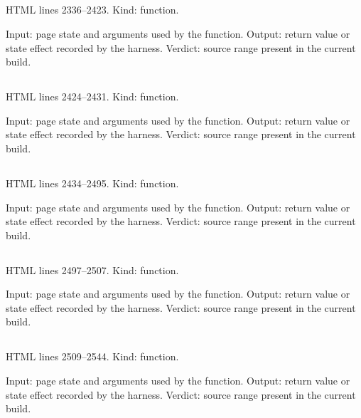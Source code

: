 \subsection*{\texttt{}}
\label{vf_60_decodeAcq}
HTML lines 2336--2423. Kind: function.

Input: page state and arguments used by the function.
Output: return value or state effect recorded by the harness.
Verdict: source range present in the current build.

\subsection*{\texttt{}}
\label{vf_61_acquisitionStats}
HTML lines 2424--2431. Kind: function.

Input: page state and arguments used by the function.
Output: return value or state effect recorded by the harness.
Verdict: source range present in the current build.

\subsection*{\texttt{}}
\label{vf_62_decodePlateModel}
HTML lines 2434--2495. Kind: function.

Input: page state and arguments used by the function.
Output: return value or state effect recorded by the harness.
Verdict: source range present in the current build.

\subsection*{\texttt{}}
\label{vf_63_decodeSubsets}
HTML lines 2497--2507. Kind: function.

Input: page state and arguments used by the function.
Output: return value or state effect recorded by the harness.
Verdict: source range present in the current build.

\subsection*{\texttt{}}
\label{vf_64_decodeProtocol}
HTML lines 2509--2544. Kind: function.

Input: page state and arguments used by the function.
Output: return value or state effect recorded by the harness.
Verdict: source range present in the current build.

